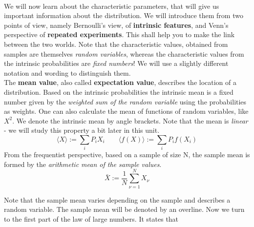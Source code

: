 \documentclass[12pt, a4paper]{scrartcl}
\begin{document}
\\

We will now learn about the characteristic parameters, that will give us important information about the distribution. We will introduce them from two points of view, namely Bernoulli’s view, of \textbf{intrinsic features}, and Venn’s perspective of \textbf{repeated experiments}.
This shall help you to make the link between the two worlds.
Note that the characteristic values, obtained from samples are themselves \textit{random variables}, whereas the characteristic values from the intrinsic probabilities are \textit{fixed numbers}! 
We will use a slightly different notation and wording to distinguish them.\\

The \textbf{mean value}, also called \textbf{expectation value}, describes the location of a distribution.
Based on the intrinsic probabilities the intrinsic mean is a fixed number given by the \textit{weighted sum of the random variable} using the probabilities as weights. One can also calculate the mean of functions of random variables, like $X^2$. We denote the intrinsic mean by angle brackets.
Note that the mean is \textit{linear} - we will study this property a bit later in this unit.\\
\begin{equation*}\boxed{\langle X \rangle := \sum_iP_iX_i \qquad
\langle f(X) \rangle := \sum_iP_if(X_i)}\end{equation*}
From the frequentist perspective, based on a sample of size N, the sample mean is formed by the \textit{arithmetic mean of the sample values}. \\

\begin{equation*}\boxed{\bar{X} := \frac{1}{N}\sum_{\nu=1}^N X_\nu}\end{equation*}

Note that the sample mean varies depending on the sample and describes a random variable. The sample mean will be denoted by an overline. 
Now we turn to the first part of the law of large numbers. It states that \\[0.2cm]
\\[0.2cm]
\\
\end{document}
